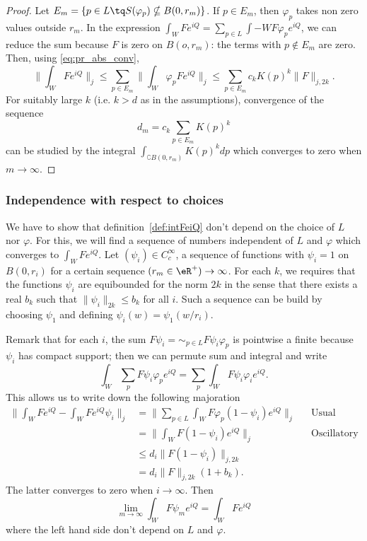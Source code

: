 \begin{proof}
	Let $E_m=\{ p\in L\tq S(\varphi_p)\nsubseteq B(0,r_m) \}$. If $p\in E_m$, then $\varphi_p$ takes non zero values outside $r_m$. In the expression $\int_WFe^{iQ}=\sum_{p\in L}\int-WF\varphi_pe^{iQ}$, we can reduce the sum because $F$ is zero on $B(o,r_m)$: the terms with $p\notin E_m$ are zero. Then, using \eqref{eq:pr_abs_conv},
	\[
		\| \int_WFe^{iQ} \|_j\leq\sum_{p\in E_m}\| \int_W\varphi_pFe^{iQ} \|_j\leq\sum_{p\in E_m}c_kK(p)^k\| F \|_{j,2k}.
	\]
	For suitably large $k$ (i.e. $k>d$ as in the assumptions), convergence of the sequence
	\[
		d_m=c_k\sum_{p\in E_m}K(p)^k
	\]
	can be studied by the integral $\int_{\complement B(0,r_m)}K(p)^kdp$ which converges to zero when $m\to\infty$.
\end{proof}

\subsubsection{Independence with respect to choices}

We have to show that definition~\ref{def:intFeiQ} don't depend on the choice of $L$ nor $\varphi$. For this, we will find a sequence of numbers independent of $L$ and $\varphi$ which converges to $\int_WFe^{iQ}$. Let $(\psi_i)\in C^{\infty}_c$, a sequence of functions with $\psi_i=1$ on $B(0,r_i)$ for a certain sequence $(r_m\in\eR^+)\to\infty$. For each $k$, we requires that the functions $\psi_i$ are equibounded for the norm $2k$ in the sense that there exists a real $b_k$ such that $\| \psi_i \|_{2k}\leq b_k$ for all $i$. Such a sequence can be build by choosing $\psi_1$ and defining $\psi_i(w)=\psi_1(w/r_i)$.

Remark that for each $i$, the sum $F\psi_i=\sim_{p\in L}F\psi_i\varphi_p$ is pointwise a finite because $\psi_i$ has compact support; then we can permute sum and integral and write
\[
	\int_W \sum_pF\psi_i\varphi_pe^{iQ}=\sum_p\int_WF\psi_i\varphi_ie^{iQ}.
\]
This allows us to write down the following majoration
\begin{equation}
	\begin{aligned}
		\| \int_WFe^{iQ}-\int_WFe^{iQ}\psi_i \|_j & =\| \sum_{p\in L}\int_WF\varphi_p(1-\psi_i)e^{iQ} \|_j &  & \textrm{Usual integral}       \\
		                                          & =\| \int_WF(1-\psi_i)e^{iQ} \|_j                       &  & \textrm{Oscillatory integral} \\
		                                          & \leq d_i\| F(1-\psi_i) \|_{j,2k}                                                          \\
		                                          & =d_i\| F \|_{j,2k}(1+b_k).
	\end{aligned}
\end{equation}
The latter converges to zero when $i\to\infty$. Then
\begin{equation}
	\lim_{m\to\infty}\int_WF\psi_me^{iQ}=\int_WFe^{iQ}
\end{equation}
where the left hand side don't depend on $L$ and $\varphi$.

